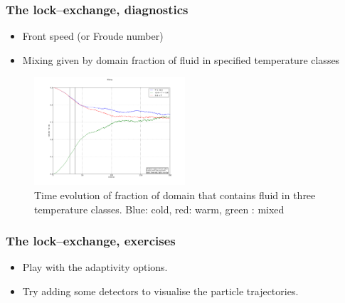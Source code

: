 %
\begin{frame}
    \frametitle{The lock--exchange, diagnostics}
\begin{itemize}
\item Front speed (or Froude number)
\item Mixing given by domain fraction of fluid in specified temperature classes
\end{itemize}

\begin{figure}
\centering
\includegraphics[width=0.5\textwidth]{./lock_exchange/mixing}
\caption{Time evolution of fraction of domain that contains fluid in three temperature classes. Blue: cold, red: warm, green : mixed}
\end{figure}

\end{frame}
%
\begin{frame}
    \frametitle{The lock--exchange, exercises}
\begin{itemize}
\item Play with the adaptivity options.
\item Try adding some detectors to visualise the particle trajectories.
\end{itemize}

\end{frame}
